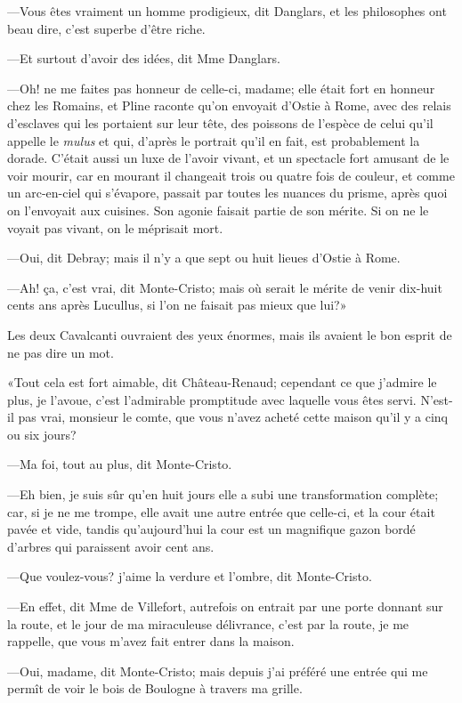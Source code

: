 —Vous êtes vraiment un homme prodigieux, dit Danglars, et les philosophes ont beau dire, c'est superbe d'être riche.  

—Et surtout d'avoir des idées, dit Mme Danglars. 

—Oh! ne me faites pas honneur de celle-ci, madame; elle était fort en honneur chez les Romains, et Pline raconte qu'on envoyait d'Ostie à Rome, avec des relais d'esclaves qui les portaient sur leur tête, des poissons de l'espèce de celui qu'il appelle le \textit{mulus} et qui, d'après le portrait qu'il en fait, est probablement la dorade. C'était aussi un luxe de l'avoir vivant, et un spectacle fort amusant de le voir mourir, car en mourant il changeait trois ou quatre fois de couleur, et comme un arc-en-ciel qui s'évapore, passait par toutes les nuances du prisme, après quoi on l'envoyait aux cuisines. Son agonie faisait partie de son mérite. Si on ne le voyait pas vivant, on le méprisait mort. 

—Oui, dit Debray; mais il n'y a que sept ou huit lieues d'Ostie à Rome. 

—Ah! ça, c'est vrai, dit Monte-Cristo; mais où serait le mérite de venir dix-huit cents ans après Lucullus, si l'on ne faisait pas mieux que lui?» 

Les deux Cavalcanti ouvraient des yeux énormes, mais ils avaient le bon esprit de ne pas dire un mot. 

«Tout cela est fort aimable, dit Château-Renaud; cependant ce que j'admire le plus, je l'avoue, c'est l'admirable promptitude avec laquelle vous êtes servi. N'est-il pas vrai, monsieur le comte, que vous n'avez acheté cette maison qu'il y a cinq ou six jours? 

—Ma foi, tout au plus, dit Monte-Cristo. 

—Eh bien, je suis sûr qu'en huit jours elle a subi une transformation complète; car, si je ne me trompe, elle avait une autre entrée que celle-ci, et la cour était pavée et vide, tandis qu'aujourd'hui la cour est un magnifique gazon bordé d'arbres qui paraissent avoir cent ans. 

—Que voulez-vous? j'aime la verdure et l'ombre, dit Monte-Cristo. 

—En effet, dit Mme de Villefort, autrefois on entrait par une porte donnant sur la route, et le jour de ma miraculeuse délivrance, c'est par la route, je me rappelle, que vous m'avez fait entrer dans la maison. 

—Oui, madame, dit Monte-Cristo; mais depuis j'ai préféré une entrée qui me permît de voir le bois de Boulogne à travers ma grille. 

